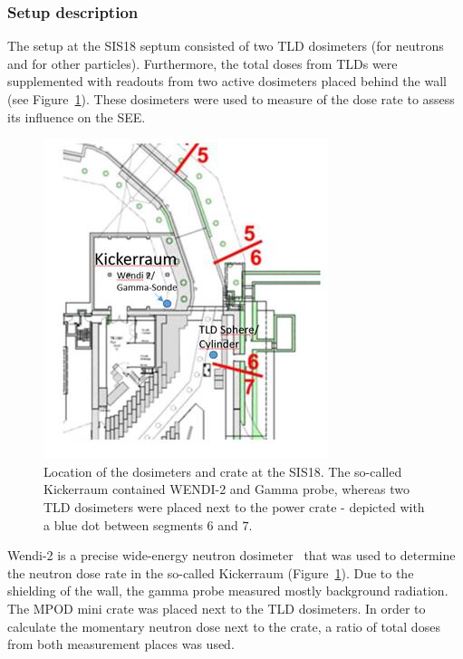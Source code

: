 \subsubsection{Setup description}
The setup at the SIS18 septum consisted of two \gls{TLD} dosimeters (for neutrons and for other particles). Furthermore, the total doses from TLDs were supplemented with readouts from two active dosimeters placed behind the wall (see Figure~\ref{fig:spec_des}). These dosimeters were used to measure of the dose rate to assess its influence on the \gls{SEE}.
\begin{figure}[!ht]
    \centering
    \includegraphics[width=0.45\columnwidth]{Chapter4/images/septum.jpg}
    \caption{Location of the dosimeters and crate at the SIS18. The so-called Kickerraum contained WENDI-2 and Gamma probe, whereas two TLD dosimeters were placed next to the power crate - depicted with a blue dot between segments $6$ and $7$.}
    \label{fig:spec_des}
\end{figure}

Wendi-2 is a precise wide-energy neutron dosimeter~\cite{wendi} that was used to determine the neutron dose rate in the so-called Kickerraum (Figure~\ref{fig:spec_des}). Due to the shielding of the wall, the gamma probe measured mostly background radiation. The MPOD mini crate was placed next to the TLD dosimeters. In order to calculate the momentary neutron dose next to the crate, a ratio of total doses from both measurement places was used. 
\newpage
